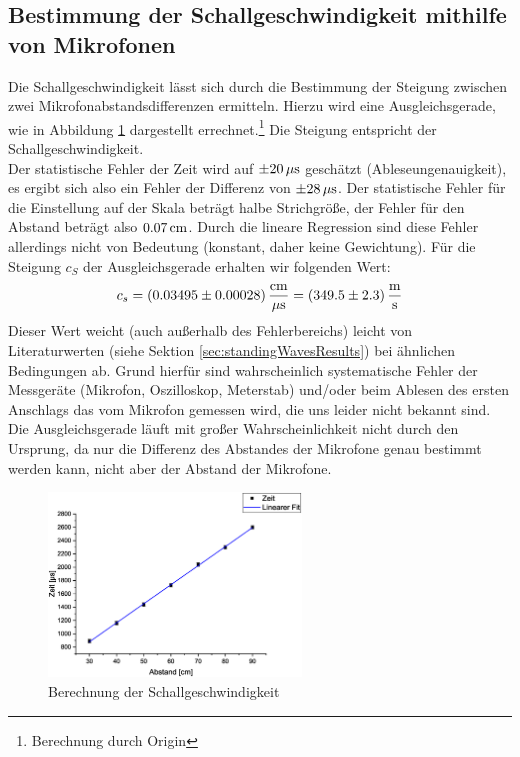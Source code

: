\subsection{Bestimmung der Schallgeschwindigkeit mithilfe von Mikrofonen}
Die Schallgeschwindigkeit lässt sich durch die Bestimmung der Steigung zwischen zwei Mikrofonabstandsdifferenzen ermitteln. Hierzu wird eine Ausgleichsgerade, wie in Abbildung \ref{fig:aufgabe3} dargestellt errechnet.\footnote{Berechnung durch Origin} Die Steigung entspricht der Schallgeschwindigkeit.\\
Der statistische Fehler der Zeit wird auf $\pm \unit[20]{\mu s}$ geschätzt (Ableseungenauigkeit), es ergibt sich also ein Fehler der Differenz von $\pm \unit[28]{\mu s}$. Der statistische Fehler für die Einstellung auf der Skala beträgt halbe Strichgröße, der Fehler für den Abstand beträgt also $\unit[0.07]{cm}$. Durch die lineare Regression sind diese Fehler allerdings nicht von Bedeutung (konstant, daher keine Gewichtung). Für die Steigung $c_S$ der Ausgleichsgerade erhalten wir folgenden Wert:
\begin{equation}
c_s = \unit[(0.03495 \pm 0.00028)]{\frac{cm}{\mu s}} = \unit[(349.5 \pm 2.3)]{\frac{m}{s}}
\end{equation}
Dieser Wert weicht (auch außerhalb des Fehlerbereichs) leicht von Literaturwerten (siehe Sektion \ref{sec:standingWavesResults}) bei ähnlichen Bedingungen ab.
Grund hierfür sind wahrscheinlich systematische Fehler der Messgeräte (Mikrofon, Oszilloskop, Meterstab) und/oder beim Ablesen des ersten Anschlags das vom Mikrofon gemessen wird, die uns leider nicht bekannt sind.\\
Die Ausgleichsgerade läuft mit großer Wahrscheinlichkeit nicht durch den Ursprung, da nur die Differenz des Abstandes der Mikrofone genau bestimmt werden kann, nicht aber der Abstand der Mikrofone.

\begin{figure}
\begin{center}
\includegraphics[width=0.6\textwidth]{Bilder/aufgabe3.eps}
\caption{Berechnung der Schallgeschwindigkeit}
\label{fig:aufgabe3}
\end{center}
\end{figure}